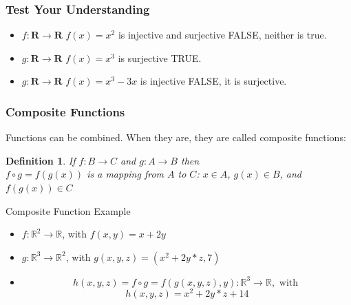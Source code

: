 \documentclass[aspectratio=169, handout]{beamer}
\newtheorem{defn}{Definition}
\numberwithin{equation}{section}
\begin{document}
\begin{frame}
\frametitle{Test Your Understanding}


\begin{itemize}
\item $f: \mathbf{R}\rightarrow \mathbf{R}$ $f(x)=x^2$ is injective and surjective FALSE, neither is true.
\item $g: \mathbf{R}\rightarrow \mathbf{R}$ $f(x)=x^3$ is surjective TRUE. 
\item  $g: \mathbf{R}\rightarrow \mathbf{R}$ $f(x)=x^3-3x$ is injective FALSE, it is surjective.
\end{itemize}
   
\end{frame}

\begin{frame}
\frametitle{Composite Functions}
Functions can be combined.  When they are, they are called composite functions:
\begin{defn}
 If $f:B\rightarrow C$ and $g: A\rightarrow B$ then \\$f\circ g = f(g(x))$ is a mapping from $A$ to $C$: $x\in A$, $g(x)\in B$, and $f(g(x))\in C$
\end{defn}

\end{frame}


\begin{frame}{Composite Function Example}

\begin{itemize}
\item $f: \mathbb{R}^2\rightarrow \mathbb{R}$, with $f(x, y)=x+2y$ 

\item $g: \mathbb{R}^3\rightarrow \mathbb{R}^2$, with $g(x, y, z)=(x^2+2y*z, 7)$ \pause
\end{itemize}

\begin{itemize}
\item $$h(x,y,z)=f\circ g=f(g(x,y,z),y): \mathbb{R}^3\rightarrow\mathbb{R}, \text{ with }$$
$$h(x, y, z)=x^2+2y*z+14$$\pause

\end{itemize}

\end{frame}
\end{document}
